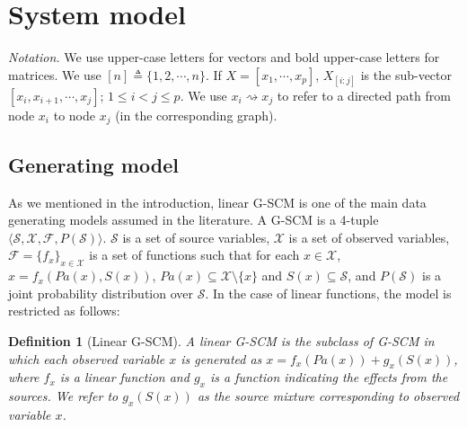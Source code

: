 \documentclass[12pt]{article}
\newtheorem{definition}{Definition}
\newcommand{\setX}{\mathcal{X}}
\newcommand{\setS}{\mathcal{S}}
\begin{document}
\vspace{-5mm}
\section{System model}
\label{sec:system_model}
\vspace{-3mm}
{\it Notation.} We use upper-case letters for vectors and bold upper-case letters for matrices. We use $[n]\triangleq \{1,2,\cdots,n\}$. If $X=[x_1,\cdots,x_p]$, $X_{[i:j]}$ is the sub-vector $[x_i,x_{i+1},\cdots,x_j]$; $1\leq i < j \leq p$. We use $x_i \rightsquigarrow x_j$ to refer to a directed path from node $x_i$ to node $x_j$ (in the corresponding graph). 
\vspace{-4mm}
\subsection{Generating model}\label{Generating Model} \vspace{-2mm}
As we mentioned in the introduction, linear G-SCM is one of the main data generating models assumed in the literature. A G-SCM \citep[Definition 7.1.1]{pearl2009causality} is a 4-tuple $\langle \setS, \setX, \mathcal{F}, P(\setS)\rangle$. $\setS$ is a set of source variables, $\setX$ is a set of observed variables, $\mathcal{F}=\{f_x\}_{x\in \setX}$ is a set of functions such that for each $x\in \setX$, $x=f_x(Pa(x),S(x))$, $Pa(x)\subseteq \setX \setminus\{x\}$ and $S(x)\subseteq \setS$, and $P(\setS)$ is a joint probability distribution over $\setS$.  In the case of linear functions, the model is restricted as follows:

\vspace{-2mm}
\begin{definition}[Linear G-SCM]
A linear G-SCM is the subclass of G-SCM in which each observed variable $x$ is generated 
as $x=f_x(Pa(x))+g_x(S(x))$, where $f_x$ is a linear function and $g_x$ is a function indicating the effects from the sources. We refer to $g_x(S(x))$ as the source mixture corresponding to observed variable $x$.
\vspace{-2mm}
\end{definition}

\end{document}
